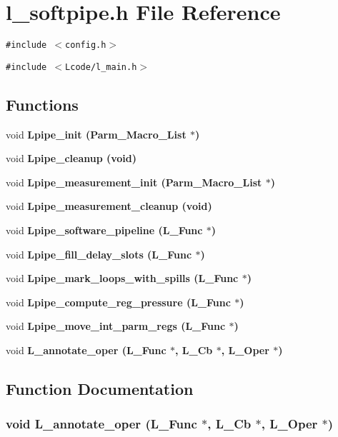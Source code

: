 \section{l\_\-softpipe.h File Reference}
\label{l__softpipe_8h}
{\tt \#include $<$config.h$>$}\par
{\tt \#include $<$Lcode/l\_\-main.h$>$}\par
\subsection*{Functions}
\begin{CompactItemize}
\item 
void \bf{Lpipe\_\-init} (Parm\_\-Macro\_\-List $\ast$)
\item 
void \bf{Lpipe\_\-cleanup} (void)
\item 
void \bf{Lpipe\_\-measurement\_\-init} (Parm\_\-Macro\_\-List $\ast$)
\item 
void \bf{Lpipe\_\-measurement\_\-cleanup} (void)
\item 
void \bf{Lpipe\_\-software\_\-pipeline} (L\_\-Func $\ast$)
\item 
void \bf{Lpipe\_\-fill\_\-delay\_\-slots} (L\_\-Func $\ast$)
\item 
void \bf{Lpipe\_\-mark\_\-loops\_\-with\_\-spills} (L\_\-Func $\ast$)
\item 
void \bf{Lpipe\_\-compute\_\-reg\_\-pressure} (L\_\-Func $\ast$)
\item 
void \bf{Lpipe\_\-move\_\-int\_\-parm\_\-regs} (L\_\-Func $\ast$)
\item 
void \bf{L\_\-annotate\_\-oper} (L\_\-Func $\ast$, L\_\-Cb $\ast$, L\_\-Oper $\ast$)
\end{CompactItemize}


\subsection{Function Documentation}
\subsubsection{\setlength{\rightskip}{0pt plus 5cm}void L\_\-annotate\_\-oper (L\_\-Func $\ast$, L\_\-Cb $\ast$, L\_\-Oper $\ast$)}\label{l__softpipe_8h_fd8def20f61a7cd2a65cd6f3e89f233f}




